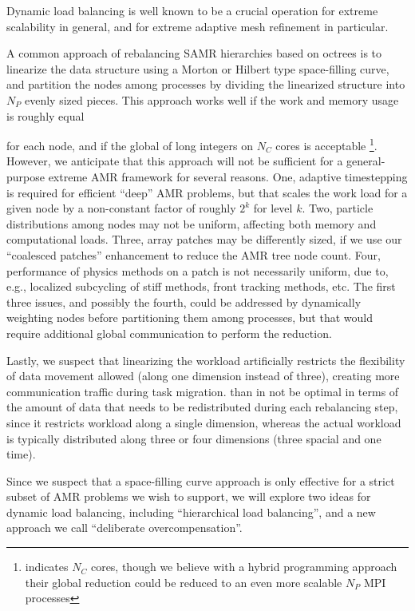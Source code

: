 \documentclass[14pt,letter]{article}
\begin{document}
Dynamic load balancing is well known to be a crucial operation for
extreme scalability in general, and for extreme adaptive mesh
refinement in particular.

A common approach of rebalancing SAMR hierarchies based on octrees is
to linearize the data structure using a Morton or Hilbert type
space-filling curve, and partition the nodes among processes by
dividing the linearized structure into $N_P$ evenly sized pieces.
This approach works well if the work and memory usage is roughly equal

for each node, and if the global  of long
integers on $N_C$ cores is acceptable \footnote{\cite{BuGh08}
  indicates $N_C$ cores, though we believe with a hybrid programming
  approach their global reduction could be reduced to an even more
  scalable $N_P$ MPI processes}.  However, we anticipate that this
approach will not be sufficient for a general-purpose extreme AMR
framework for several reasons.
%
One, adaptive timestepping is required for efficient ``deep'' AMR
problems, but that scales the work load for a given node by a
non-constant factor of roughly $2^k$ for level $k$.
%
Two, particle distributions among nodes may not be uniform, affecting both memory and computational loads.
%
Three, array patches may be differently sized, if we use our ``coalesced patches'' enhancement to reduce the AMR tree node count.  
%
Four, performance of physics methods on a patch is not necessarily
uniform, due to, e.g., localized subcycling of stiff methods, front
tracking methods, etc.  The first three issues, and possibly the
fourth, could be addressed by dynamically weighting nodes before
partitioning them among processes, but that would require additional
global communication to perform the reduction.
%

Lastly, we suspect that linearizing the workload artificially
restricts the flexibility of data movement allowed (along one
dimension instead of three), creating more communication traffic
during task migration.  than in not be optimal in terms of the amount
of data that needs to be redistributed during each rebalancing step,
since it restricts workload along a single dimension, whereas the
actual workload is typically distributed along three or four
dimensions (three spacial and one time).

Since we suspect that a space-filling curve approach is only effective
for a strict subset of AMR problems we wish to support, we will
explore two ideas for dynamic load balancing, including ``hierarchical
load balancing'', and a new approach we call ``deliberate
overcompensation''.
\end{document}
